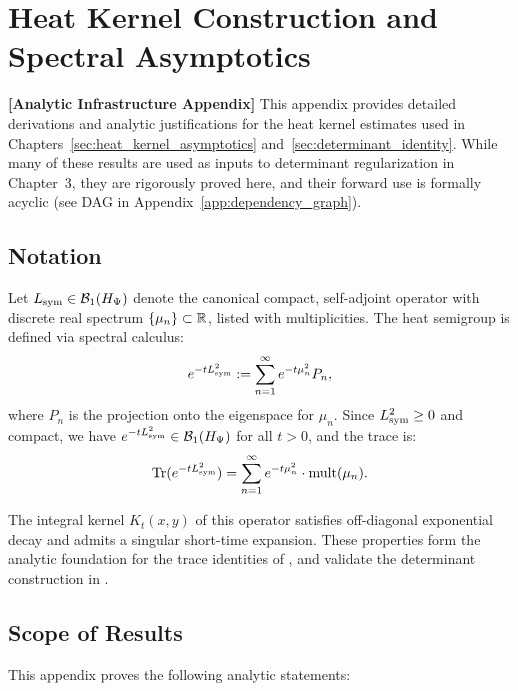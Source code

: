 \section{Heat Kernel Construction and Spectral Asymptotics}
\label{app:heat_kernel_construction}

\noindent\textbf{[Analytic Infrastructure Appendix]}  
This appendix provides detailed derivations and analytic justifications for the heat kernel estimates used in Chapters~\ref{sec:heat_kernel_asymptotics} and~\ref{sec:determinant_identity}. While many of these results are used as inputs to determinant regularization in Chapter~3, they are rigorously proved here, and their forward use is formally acyclic (see DAG in Appendix~\ref{app:dependency_graph}).

\subsection*{Notation}

Let \( L_{\mathrm{sym}} \in \mathcal{B}_1(H_{\Psi}) \) denote the canonical compact, self-adjoint operator with discrete real spectrum \( \{ \mu_n \} \subset \mathbb{R} \), listed with multiplicities. The heat semigroup is defined via spectral calculus:
\[
e^{-t L_{\mathrm{sym}}^2} := \sum_{n=1}^\infty e^{-t \mu_n^2} P_n,
\]
where \( P_n \) is the projection onto the eigenspace for \( \mu_n \). Since \( L_{\mathrm{sym}}^2 \ge 0 \) and compact, we have \( e^{-t L_{\mathrm{sym}}^2} \in \mathcal{B}_1(H_{\Psi}) \) for all \( t > 0 \), and the trace is:
\[
\operatorname{Tr}(e^{-t L_{\mathrm{sym}}^2}) = \sum_{n=1}^\infty e^{-t \mu_n^2} \cdot \operatorname{mult}(\mu_n).
\]

The integral kernel \( K_t(x,y) \) of this operator satisfies off-diagonal exponential decay and admits a singular short-time expansion. These properties form the analytic foundation for the trace identities of , and validate the determinant construction in .

\subsection*{Scope of Results}

This appendix proves the following analytic statements:

